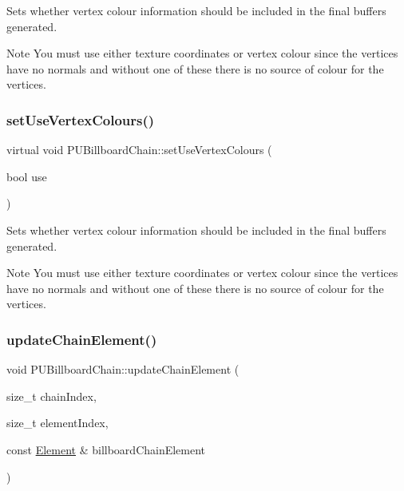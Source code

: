 Sets whether vertex colour information should be included in the final buffers generated. \begin{DoxyNote}{Note}
You must use either texture coordinates or vertex colour since the vertices have no normals and without one of these there is no source of colour for the vertices. 
\end{DoxyNote}
\mbox{\label{classPUBillboardChain_a4e5aebd96aff64bb21c594f0d7d2355d}} 
\subsubsection{\texorpdfstring{set\+Use\+Vertex\+Colours()}{setUseVertexColours()}\hspace{0.1cm}{\footnotesize\ttfamily [2/2]}}
{\footnotesize\ttfamily virtual void P\+U\+Billboard\+Chain\+::set\+Use\+Vertex\+Colours (\begin{DoxyParamCaption}\item[{bool}]{use }\end{DoxyParamCaption})\hspace{0.3cm}{\ttfamily [virtual]}}

Sets whether vertex colour information should be included in the final buffers generated. \begin{DoxyNote}{Note}
You must use either texture coordinates or vertex colour since the vertices have no normals and without one of these there is no source of colour for the vertices. 
\end{DoxyNote}
\mbox{\label{classPUBillboardChain_a903a9a6a59673a296b10d52efc2656e8}} 
\subsubsection{\texorpdfstring{update\+Chain\+Element()}{updateChainElement()}\hspace{0.1cm}{\footnotesize\ttfamily [1/2]}}
{\footnotesize\ttfamily void P\+U\+Billboard\+Chain\+::update\+Chain\+Element (\begin{DoxyParamCaption}\item[{size\+\_\+t}]{chain\+Index,  }\item[{size\+\_\+t}]{element\+Index,  }\item[{const \hyperlink{classPUBillboardChain_1_1Element}{Element} \&}]{billboard\+Chain\+Element }\end{DoxyParamCaption})\hspace{0.3cm}{\ttfamily [virtual]}}

